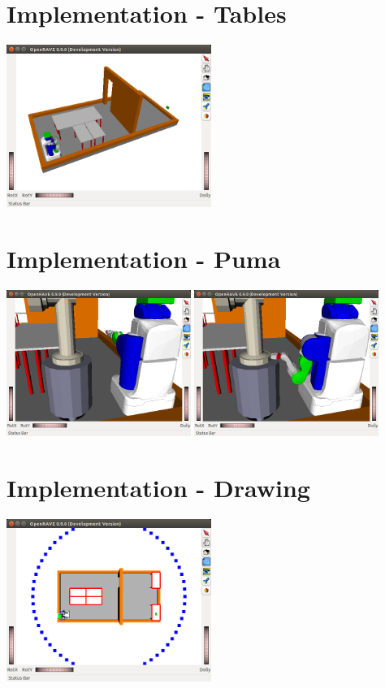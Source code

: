 \documentclass[10pt,letterpaper]{article}
\begin{document}
\section{Implementation - Tables}
\begin{center}
\includegraphics[width=0.5\textwidth]{HW1_tables_ss}
\end{center}

\section{Implementation - Puma}
\begin{center}
\includegraphics[width=0.45\textwidth]{HW1_puma_ss1}
\includegraphics[width=0.45\textwidth]{HW1_puma_ss2}
\end{center}

\section{Implementation - Drawing}
\begin{center}
\includegraphics[width=0.5\textwidth]{HW1_drawing_ss}
\end{center}
\end{document}
